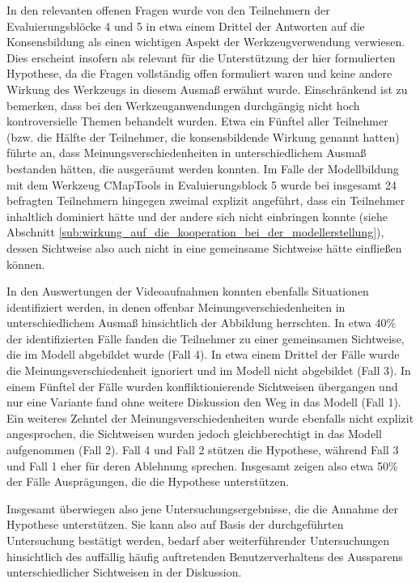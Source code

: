 In den relevanten offenen Fragen wurde von den Teilnehmern der Evaluierungsblöcke 4 und 5 in etwa einem Drittel der Antworten auf die Konsensbildung als einen wichtigen Aspekt der Werkzeugverwendung verwiesen. Dies erscheint insofern als relevant für die Unterstützung der hier formulierten Hypothese, da die Fragen vollständig offen formuliert waren und keine andere Wirkung des Werkzeugs in diesem Ausmaß erwähnt wurde. Einschränkend ist zu bemerken, dass bei den Werkzeuganwendungen durchgängig nicht hoch kontroversielle Themen behandelt wurden. Etwa ein Fünftel aller Teilnehmer (bzw. die Hälfte der Teilnehmer, die konsensbildende Wirkung genannt hatten) führte an, dass Meinungsverschiedenheiten in unterschiedlichem Ausmaß bestanden hätten, die ausgeräumt werden konnten. Im Falle der Modellbildung mit dem Werkzeug CMapTools in Evaluierungsblock 5 wurde bei insgesamt 24 befragten Teilnehmern hingegen zweimal explizit angeführt, dass ein Teilnehmer inhaltlich dominiert hätte und der andere sich nicht einbringen konnte (siehe Abschnitt \ref{sub:wirkung_auf_die_kooperation_bei_der_modellerstellung}), dessen Sichtweise also auch nicht in eine gemeinsame Sichtweise hätte einfließen können.

In den Auswertungen der Videoaufnahmen konnten ebenfalls Situationen identifiziert werden, in denen offenbar Meinungsverschiedenheiten in unterschiedlichem Ausmaß hinsichtlich der Abbildung herrschten. In etwa 40\% der identifizierten Fälle fanden die Teilnehmer zu einer gemeinsamen Sichtweise, die im Modell abgebildet wurde (Fall 4). In etwa einem Drittel der Fälle wurde die Meinungsverschiedenheit ignoriert und im Modell nicht abgebildet (Fall 3). In einem Fünftel der Fälle wurden konfliktionierende Sichtweisen übergangen und nur eine Variante fand ohne weitere Diskussion den Weg in das Modell (Fall 1). Ein weiteres Zehntel der Meinungsverschiedenheiten wurde ebenfalls nicht explizit angesprochen, die Sichtweisen wurden jedoch gleichberechtigt in das Modell aufgenommen (Fall 2). Fall 4 und Fall 2 stützen die Hypothese, während Fall 3 und Fall 1 eher für deren Ablehnung sprechen. Insgesamt zeigen also etwa 50\% der Fälle Ausprägungen, die die Hypothese unterstützen.   

Insgesamt überwiegen also jene Untersuchungsergebnisse, die die Annahme der Hypothese unterstützen. Sie kann also auf Basis der durchgeführten Untersuchung bestätigt werden, bedarf aber weiterführender Untersuchungen hinsichtlich des auffällig häufig auftretenden Benutzerverhaltens des Aussparens unterschiedlicher Sichtweisen in der Diskussion.

